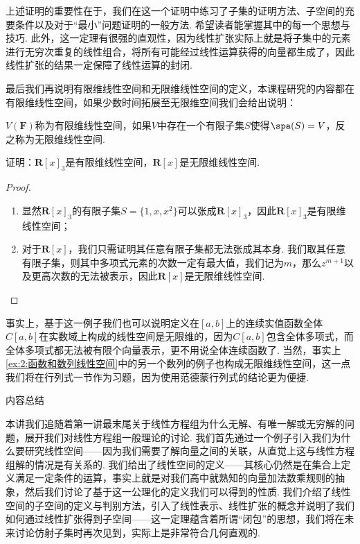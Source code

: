 上述证明的重要性在于，我们在这一个证明中练习了子集的证明方法、子空间的充要条件以及对于``最小''问题证明的一般方法. 希望读者能掌握其中的每一个思想与技巧. 此外，这一定理有很强的直观性，因为线性扩张实际上就是将子集中的元素进行无穷次重复的线性组合，将所有可能经过线性运算获得的向量都生成了，因此线性扩张的结果一定保障了线性运算的封闭.

最后我们再说明有限维线性空间和无限维线性空间的定义，本课程研究的内容都在有限维线性空间，如果少数时间拓展至无限维空间我们会给出说明：
\begin{definition}
    $V(\mathbf{F})$称为有限维线性空间，如果$V$中存在一个有限子集$S$使得$\spa(S)=V$，反之称为无限维线性空间.
\end{definition}

\begin{example}
    证明：$\mathbf{R}[x]_3$是有限维线性空间，$\mathbf{R}[x]$是无限维线性空间.
\end{example}

\begin{proof}
    \begin{enumerate}
        \item 显然$\mathbf{R}[x]_3$的有限子集$S=\{1,x,x^2\}$可以张成$\mathbf{R}[x]_3$，因此$\mathbf{R}[x]_3$是有限维线性空间；

        \item 对于$\mathbf{R}[x]$，我们只需证明其任意有限子集都无法张成其本身. 我们取其任意有限子集，则其中多项式元素的次数一定有最大值，我们记为$m$，那么$z^{m+1}$以及更高次数的无法被表示，因此$\mathbf{R}[x]$是无限维线性空间.
    \end{enumerate}
\end{proof}

事实上，基于这一例子我们也可以说明定义在$[a,b]$上的连续实值函数全体$C[a,b]$在实数域上构成的线性空间是无限维的，因为$C[a,b]$包含全体多项式，而全体多项式都无法被有限个向量表示，更不用说全体连续函数了. 当然，事实上\autoref{ex:2:函数和数列线性空间}中的另一个数列的例子也构成无限维线性空间，这一点我们将在行列式一节作为习题，因为使用范德蒙行列式的结论更为便捷.

\vspace{2ex}
\centerline{\heiti \Large 内容总结}

本讲我们追随着第一讲最末尾关于线性方程组为什么无解、有唯一解或无穷解的问题，展开我们对线性方程组一般理论的讨论. 我们首先通过一个例子引入我们为什么要研究线性空间——因为我们需要了解向量之间的关联，从直觉上这与线性方程组解的情况是有关系的. 我们给出了线性空间的定义——其核心仍然是在集合上定义满足一定条件的运算，事实上就是对我们高中就熟知的向量加法数乘规则的抽象，然后我们讨论了基于这一公理化的定义我们可以得到的性质. 我们介绍了线性空间的子空间的定义与判别方法，引入了线性表示、线性扩张的概念并说明了我们如何通过线性扩张得到子空间——这一定理蕴含着所谓``闭包''的思想，我们将在未来讨论仿射子集时再次见到，实际上是非常符合几何直观的.

